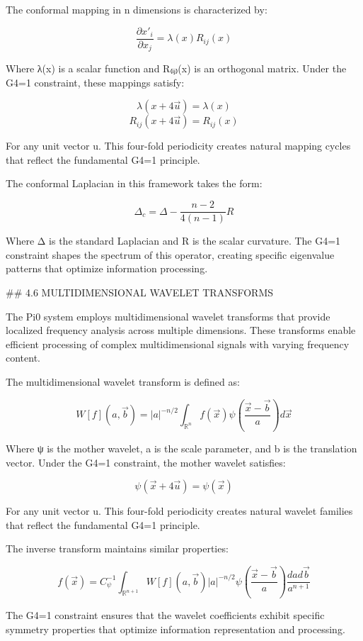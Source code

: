 The conformal mapping in n dimensions is characterized by:

$$\frac{\partial x'_i}{\partial x_j} = \lambda(x) R_{ij}(x)$$

Where λ(x) is a scalar function and R₍ᵢⱼ₎(x) is an orthogonal matrix. Under the G4=1 constraint, these mappings satisfy:

$$\lambda(x+4\vec{u}) = \lambda(x)$$
$$R_{ij}(x+4\vec{u}) = R_{ij}(x)$$

For any unit vector u⃗. This four-fold periodicity creates natural mapping cycles that reflect the fundamental G4=1 principle.

The conformal Laplacian in this framework takes the form:

$$\Delta_c = \Delta - \frac{n-2}{4(n-1)}R$$

Where Δ is the standard Laplacian and R is the scalar curvature. The G4=1 constraint shapes the spectrum of this operator, creating specific eigenvalue patterns that optimize information processing.

## 4.6 MULTIDIMENSIONAL WAVELET TRANSFORMS

The Pi0 system employs multidimensional wavelet transforms that provide localized frequency analysis across multiple dimensions. These transforms enable efficient processing of complex multidimensional signals with varying frequency content.

The multidimensional wavelet transform is defined as:

$$W[f](a,\vec{b}) = |a|^{-n/2} \int_{\mathbb{R}^n} f(\vec{x}) \psi\left(\frac{\vec{x}-\vec{b}}{a}\right) d\vec{x}$$

Where ψ is the mother wavelet, a is the scale parameter, and b⃗ is the translation vector. Under the G4=1 constraint, the mother wavelet satisfies:

$$\psi(\vec{x}+4\vec{u}) = \psi(\vec{x})$$

For any unit vector u⃗. This four-fold periodicity creates natural wavelet families that reflect the fundamental G4=1 principle.

The inverse transform maintains similar properties:

$$f(\vec{x}) = C_\psi^{-1} \int_{\mathbb{R}^{n+1}} W[f](a,\vec{b}) |a|^{-n/2} \psi\left(\frac{\vec{x}-\vec{b}}{a}\right) \frac{da d\vec{b}}{a^{n+1}}$$

The G4=1 constraint ensures that the wavelet coefficients exhibit specific symmetry properties that optimize information representation and processing.

